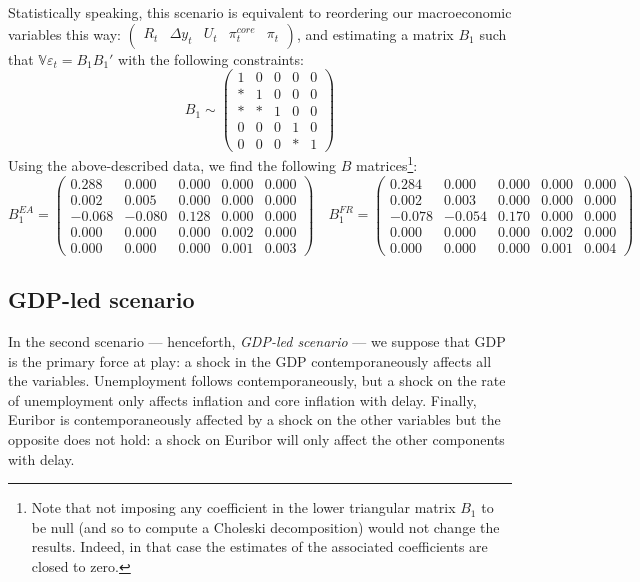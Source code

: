 \documentclass[
  11pt,
]{article}
\begin{document}
Statistically speaking, this scenario is equivalent to reordering our macroeconomic variables this way: \(\begin{pmatrix} R_{t} &\Delta y_{t} & U_{t} &\pi^{core}_{t} &\pi_{t} \end{pmatrix}\), and estimating a matrix \(B_1\) such that \(\mathbb V\varepsilon_t=B_1B_1'\) with the following constraints:
\[ B_1\sim\begin{pmatrix}1 & 0 & 0 & 0 & 0\\
* & 1 & 0 & 0 & 0\\
* & * & 1 & 0 & 0\\
0 & 0 & 0 & 1 & 0\\
0 & 0 & 0 & * & 1
\end{pmatrix}\]
Using the above-described data, we find the following \(B\) matrices\footnote{
  Note that not imposing any coefficient in the lower triangular matrix \(B_1\) to be null (and so to compute a Choleski decomposition) would not change the results. Indeed, in that case the estimates of the associated coefficients are closed to zero.}:
\[B_1^{EA} =\begin{pmatrix}
 0.288 & 0.000 & 0.000 & 0.000 & 0.000 \\
0.002 & 0.005 & 0.000 & 0.000 & 0.000 \\
-0.068 & -0.080 & 0.128 & 0.000 & 0.000 \\
0.000 & 0.000 & 0.000 & 0.002 & 0.000 \\
0.000 & 0.000 & 0.000 & 0.001 & 0.003 
\end{pmatrix}
\quad
B_1^{FR}=\begin{pmatrix}
 0.284 & 0.000 & 0.000 & 0.000 & 0.000 \\
0.002 & 0.003 & 0.000 & 0.000 & 0.000 \\
-0.078 & -0.054 & 0.170 & 0.000 & 0.000 \\
0.000 & 0.000 & 0.000 & 0.002 & 0.000 \\
0.000 & 0.000 & 0.000 & 0.001 & 0.004 
\end{pmatrix}\]

\hypertarget{gdp-led-scenario}{%
\subsection{GDP-led scenario}\label{gdp-led-scenario}}

In the second scenario --- henceforth, \emph{GDP-led scenario} --- we suppose that GDP is the primary force at play: a shock in the GDP contemporaneously affects all the variables. Unemployment follows contemporaneously, but a shock on the rate of unemployment only affects inflation and core inflation with delay. Finally, Euribor is contemporaneously affected by a shock on the other variables but the opposite does not hold: a shock on Euribor will only affect the other components with delay.
\end{document}
